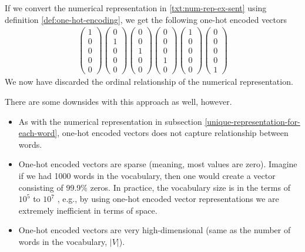 \noindent
If we convert the numerical representation in \ref{txt:num-rep-ex-sent} using definition \ref{def:one-hot-encoding}, we get the following one-hot encoded vectors
\begin{align}
    \begin{pmatrix}
    1\\
    0\\
    0\\
    0\\
    0
    \end{pmatrix}
    \begin{pmatrix}
    0\\
    1\\
    0\\
    0\\
    0
    \end{pmatrix}
    \begin{pmatrix}
    0\\
    0\\
    1\\
    0\\
    0
    \end{pmatrix}
    \begin{pmatrix}
    0\\
    0\\
    0\\
    1\\
    0
    \end{pmatrix}
    \begin{pmatrix}
    1\\
    0\\
    0\\
    0\\
    0
    \end{pmatrix}
    \begin{pmatrix}
    0\\
    0\\
    0\\
    0\\
    1
    \end{pmatrix}
\end{align}
\noindent
We now have discarded the ordinal relationship of the numerical representation.

\noindent
There are some downsides with this approach as well, however.
\begin{itemize}
    \item As with the numerical representation in subsection \ref{unique-representation-for-each-word}, one-hot encoded vectors does not capture relationship between words.
    \item One-hot encoded vectors are sparse (meaning, most values are zero). Imagine if we had 1000 words in the vocabulary, then one would create a vector consisting of 99.9\% zeros. In practice, the vocabulary size is in the terms of $10^5$ to $10^7$ \cite{mikolov2013b}, e.g., by using one-hot encoded vector representations we are extremely inefficient in terms of space.
    \item One-hot encoded vectors are very high-dimensional (same as the number of words in the vocabulary, $|V|$).
\end{itemize}

